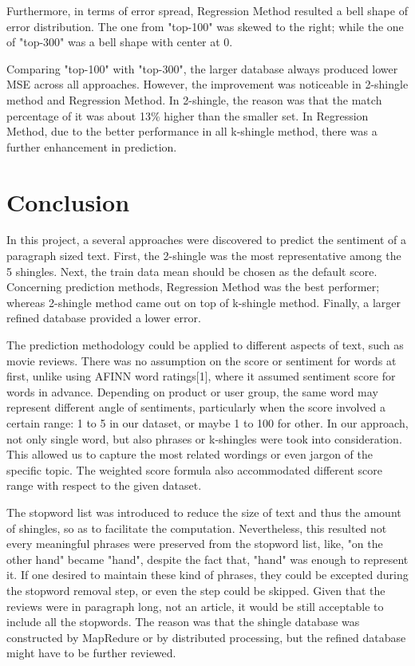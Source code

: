 Furthermore, in terms of error spread,  Regression Method resulted a bell shape of error distribution. The one from "top-100"  was skewed to the right; while the one of "top-300"  was a bell shape with center at 0.

Comparing "top-100" with "top-300", the larger database always produced lower MSE across all approaches. However, the improvement was noticeable in 2-shingle method and Regression Method. In 2-shingle, the reason was that the match percentage of it was about 13\% higher than the smaller set. In Regression Method, due to the better performance in all k-shingle method, there was a further enhancement in prediction.


\section{Conclusion}

In this project, a several approaches were discovered to predict the sentiment of a paragraph sized text. First, the 2-shingle was the most representative among the 5 shingles. Next, the train data mean should be chosen as the default score. Concerning prediction methods, Regression Method was the best performer; whereas 2-shingle method came out on top of k-shingle method. Finally, a larger refined database provided a lower error.

The prediction methodology could be applied to different aspects of text, such as movie reviews. There was no assumption on the score or sentiment for words at first, unlike using AFINN word ratings[1], where it assumed sentiment score for words in advance. Depending on product or user group, the same word may represent different angle of sentiments, particularly when the score involved a certain range: 1 to 5 in our dataset, or maybe 1 to 100 for other. In our approach, not only single word, but also phrases or k-shingles were took into consideration. This allowed us to capture the most related wordings or even jargon of the specific topic. The weighted score formula also accommodated different score range with respect to the given dataset.

The stopword list was introduced to reduce the size of text and thus the amount of shingles, so as to facilitate the computation. Nevertheless, this resulted not every meaningful phrases were preserved from the stopword list, like, "on the other hand" became "hand", despite the fact that, "hand" was enough to represent it. If one desired to maintain these kind of phrases, they could be excepted during the stopword removal step, or even the step could be skipped. Given that the reviews were in paragraph long, not an article, it would be still acceptable to include all the stopwords. The reason was that the shingle database was constructed by MapRedure or by distributed processing, but the refined database might have to be further reviewed.

